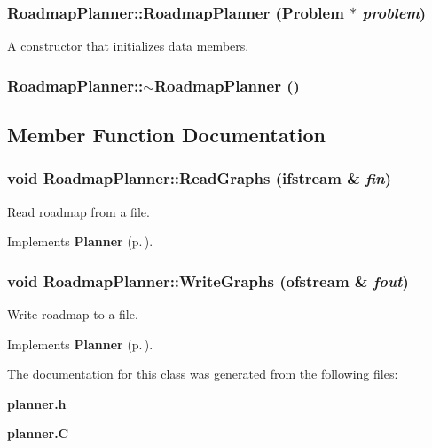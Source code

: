 \subsubsection{\setlength{\rightskip}{0pt plus 5cm}Roadmap\-Planner::Roadmap\-Planner ({\bf Problem} $\ast$ {\em problem})}\label{classRoadmapPlanner_a0}


A constructor that initializes data members.

\subsubsection{\setlength{\rightskip}{0pt plus 5cm}Roadmap\-Planner::$\sim$Roadmap\-Planner ()\hspace{0.3cm}{\tt  [inline]}}\label{classRoadmapPlanner_a1}




\subsection{Member Function Documentation}
\subsubsection{\setlength{\rightskip}{0pt plus 5cm}void Roadmap\-Planner::Read\-Graphs (ifstream \& {\em fin})\hspace{0.3cm}{\tt  [virtual]}}\label{classRoadmapPlanner_a3}


Read roadmap from a file.



Implements {\bf Planner} {\rm (p.\,\pageref{classPlanner_a6})}.
\subsubsection{\setlength{\rightskip}{0pt plus 5cm}void Roadmap\-Planner::Write\-Graphs (ofstream \& {\em fout})\hspace{0.3cm}{\tt  [virtual]}}\label{classRoadmapPlanner_a2}


Write roadmap to a file.



Implements {\bf Planner} {\rm (p.\,\pageref{classPlanner_a5})}.

The documentation for this class was generated from the following files:\begin{CompactItemize}
\item 
{\bf planner.h}\item 
{\bf planner.C}\end{CompactItemize}
